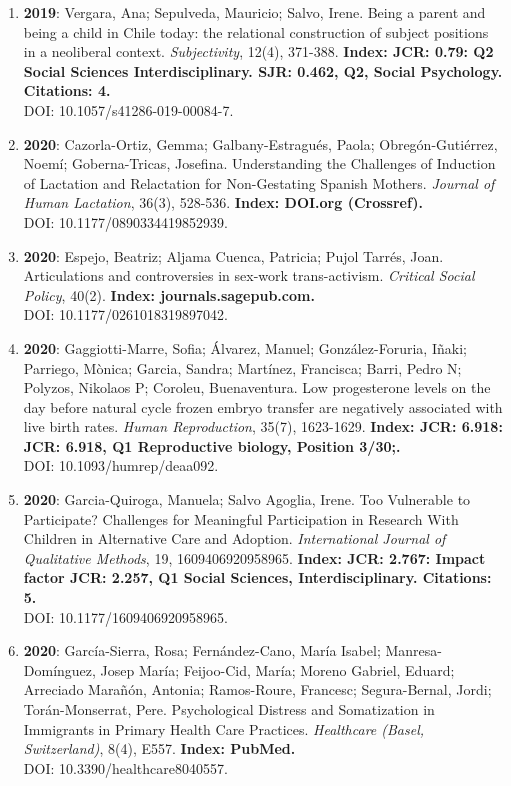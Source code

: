 \begin{enumerate}
\item {\bf 2019}: Vergara, Ana; Sepulveda, Mauricio; Salvo, Irene.  Being a parent and being a child in Chile today: the relational construction of subject positions in a neoliberal context. {\it Subjectivity}, 12(4), 371-388. {\bf Index: JCR: 0.79: Q2 Social Sciences Interdisciplinary.  SJR: 0.462, Q2, Social Psychology. Citations: 4. } \\ DOI: 10.1057/s41286-019-00084-7. \filbreak
\item {\bf 2020}: Cazorla-Ortiz, Gemma; Galbany-Estragués, Paola; Obregón-Gutiérrez, Noemí; Goberna-Tricas, Josefina.  Understanding the Challenges of Induction of Lactation and Relactation for Non-Gestating Spanish Mothers. {\it Journal of Human Lactation}, 36(3), 528-536. {\bf Index: DOI.org (Crossref). } \\ DOI: 10.1177/0890334419852939. \filbreak
\item {\bf 2020}: Espejo, Beatriz; Aljama Cuenca, Patricia; Pujol Tarrés, Joan.  Articulations and controversies in sex-work trans-activism. {\it Critical Social Policy}, 40(2). {\bf Index: journals.sagepub.com. } \\ DOI: 10.1177/0261018319897042. \filbreak
\item {\bf 2020}: Gaggiotti-Marre, Sofia; Álvarez, Manuel; González-Foruria, Iñaki; Parriego, Mònica; Garcia, Sandra; Martínez, Francisca; Barri, Pedro N; Polyzos, Nikolaos P; Coroleu, Buenaventura.  Low progesterone levels on the day before natural cycle frozen embryo transfer are negatively associated with live birth rates. {\it Human Reproduction}, 35(7), 1623-1629. {\bf Index: JCR: 6.918: JCR: 6.918, Q1 Reproductive biology, Position 3/30;.  } \\ DOI: 10.1093/humrep/deaa092. \filbreak
\item {\bf 2020}: Garcia-Quiroga, Manuela; Salvo Agoglia, Irene.  Too Vulnerable to Participate? Challenges for Meaningful Participation in Research With Children in Alternative Care and Adoption. {\it International Journal of Qualitative Methods}, 19, 1609406920958965. {\bf Index: JCR: 2.767: Impact factor JCR:  2.257, Q1 Social Sciences, Interdisciplinary.  Citations: 5. } \\ DOI: 10.1177/1609406920958965. \filbreak
\item {\bf 2020}: García-Sierra, Rosa; Fernández-Cano, María Isabel; Manresa-Domínguez, Josep María; Feijoo-Cid, María; Moreno Gabriel, Eduard; Arreciado Marañón, Antonia; Ramos-Roure, Francesc; Segura-Bernal, Jordi; Torán-Monserrat, Pere.  Psychological Distress and Somatization in Immigrants in Primary Health Care Practices. {\it Healthcare (Basel, Switzerland)}, 8(4), E557. {\bf Index: PubMed. } \\ DOI: 10.3390/healthcare8040557. \filbreak

\end{enumerate}
